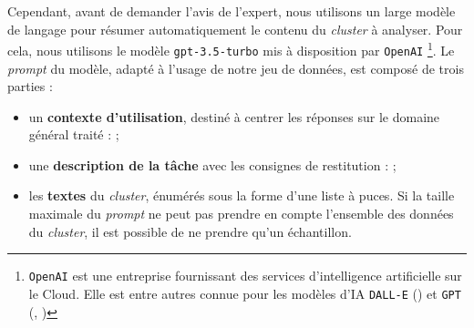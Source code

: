 			Cependant, avant de demander l'avis de l'expert, nous utilisons un large modèle de langage pour résumer automatiquement le contenu du \textit{cluster} à analyser.
			Pour cela, nous utilisons le modèle \texttt{gpt-3.5-turbo} mis à disposition par \texttt{OpenAI}
			\footnote{\texttt{OpenAI} est une entreprise fournissant des services d'intelligence artificielle sur le Cloud. Elle est entre autres connue pour les modèles d'IA \texttt{DALL-E} (\cite{ramesh-etal:2021:zeroshot-texttoimage-generation}) et \texttt{GPT} (\cite{brown-etal:2020:language-models-are}, \cite{openai:2023:chatgpt})}.
			Le \textit{prompt} du modèle, adapté à l'usage de notre jeu de données, est composé de trois parties :
			\begin{itemize}
				\item un \textbf{contexte d'utilisation}, destiné à centrer les réponses sur le domaine général traité :  ;
				\item une \textbf{description de la tâche} avec les consignes de restitution :  ;
				\item les \textbf{textes} du \textit{cluster}, énumérés sous la forme d'une liste à puces. Si la taille maximale du \textit{prompt} ne peut pas prendre en compte l'ensemble des données du \textit{cluster}, il est possible de ne prendre qu'un échantillon.
			\end{itemize}
			
			
